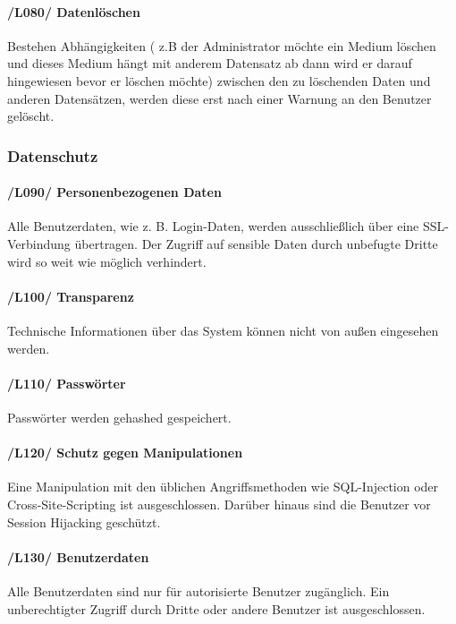 \documentclass{article}
\begin{document}
   \paragraph{/L080/ \label{080} Datenlöschen}

  Bestehen Abhängigkeiten ( z.B der Administrator möchte ein Medium löschen und dieses Medium hängt mit anderem Datensatz ab dann wird er  darauf hingewiesen bevor  er  löschen möchte)  zwischen den zu löschenden Daten und anderen Datensätzen, werden diese erst nach einer Warnung an den Benutzer gelöscht.

\subsubsection{Datenschutz}
	\paragraph{/L090/ \label{L090}
	Personenbezogenen Daten}
	Alle Benutzerdaten, wie z. B. Login-Daten, werden ausschließlich über eine SSL-Verbindung übertragen. Der Zugriff auf sensible Daten durch unbefugte Dritte wird so weit wie möglich verhindert.

	\paragraph{/L100/ \label{L100} Transparenz}
    Technische Informationen über das System können nicht von außen eingesehen werden.

   \paragraph{/L110/ \label{L110} Passwörter} Passwörter werden gehashed gespeichert.

    \paragraph{/L120/ \label{L120} Schutz gegen Manipulationen} Eine Manipulation mit den üblichen Angriffsmethoden wie SQL-Injection oder Cross-Site-Scripting ist ausgeschlossen. Darüber hinaus sind die Benutzer vor Session Hijacking geschützt.

    \paragraph{/L130/ \label{L130} Benutzerdaten}
   Alle Benutzerdaten sind nur für autorisierte Benutzer zugänglich.
   Ein unberechtigter Zugriff durch Dritte oder andere Benutzer ist ausgeschlossen.
\end{document}
